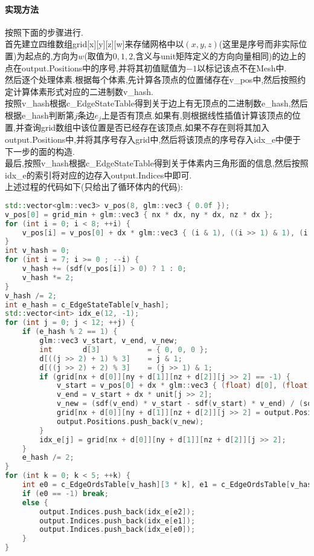 \documentclass{ctexart}
\begin{document}
\paragraph{实现方法}
按照下面的步骤进行.\\
\indent 首先建立四维数组{\codefont grid[x][y][z][w]}来存储网格中以$(x,y,z)$(这里是序号而非实际位置)为起点的,方向为$w$(取值为$0,1,2$,含义与{\codefont unit}矩阵定义的方向向量相同)的边上的点在{\codefont output.Positions}中的序号,并将其初值赋值为$-1$以标记该点不在Mesh中.\\
\indent 然后逐个处理体素.根据每个体素,先计算各顶点的位置储存在{\codefont v\_pos}中,然后按照约定计算体素形式对应的二进制数{\codefont v\_hash}.\\
\indent 按照{\codefont v\_hash}根据{\codefont c\_EdgeStateTable}得到关于边上有无顶点的二进制数{\codefont e\_hash},然后根据{\codefont e\_hash}判断第$j$条边$e_j$上是否有顶点.如果有,则根据线性插值计算该顶点的位置,并查询{\codefont grid}数组中该位置是否已经存在该顶点,如果不存在则将其加入{\codefont output.Positions}中,并将其序号存入{\codefont grid}中,然后将该顶点的序号存入{\codefont idx\_e}中便于下一步的面的构造.\\
\indent 最后,按照{\codefont v\_hash}根据{\codefont c\_EdgeStateTable}得到关于体素内三角形面的信息,然后按照{\codefont idx\_e}的索引将对应的边存入{\codefont output.Indices}中即可.\\
\indent 上述过程的代码如下(只给出了循环体内的代码):
\begin{lstlisting}[language=C++]
std::vector<glm::vec3> v_pos(8, glm::vec3 { 0.0f });
v_pos[0] = grid_min + glm::vec3 { nx * dx, ny * dx, nz * dx };
for (int i = 0; i < 8; ++i) {
    v_pos[i] = v_pos[0] + dx * glm::vec3 { (i & 1), ((i >> 1) & 1), (i >> 2) };
}
int v_hash = 0;
for (int i = 7; i >= 0 ; --i) {
    v_hash += (sdf(v_pos[i]) > 0) ? 1 : 0;
    v_hash *= 2;
}
v_hash /= 2;
int e_hash = c_EdgeStateTable[v_hash];
std::vector<int> idx_e(12, -1);
for (int j = 0; j < 12; ++j) {
    if (e_hash % 2 == 1) {
        glm::vec3 v_start, v_end, v_new;
        int       d[3]           = { 0, 0, 0 };
        d[((j >> 2) + 1) % 3]    = j & 1;
        d[((j >> 2) + 2) % 3]    = (j >> 1) & 1;
        if (grid[nx + d[0]][ny + d[1]][nz + d[2]][j >> 2] == -1) {
            v_start = v_pos[0] + dx * glm::vec3 { (float) d[0], (float) d[1], (float) d[2] };
            v_end = v_start + dx * unit[j >> 2];
            v_new = (sdf(v_end) * v_start - sdf(v_start) * v_end) / (sdf(v_end) - sdf(v_start));
            grid[nx + d[0]][ny + d[1]][nz + d[2]][j >> 2] = output.Positions.size();
            output.Positions.push_back(v_new);
        }
        idx_e[j] = grid[nx + d[0]][ny + d[1]][nz + d[2]][j >> 2];
    }
    e_hash /= 2;
}
for (int k = 0; k < 5; ++k) {
    int e0 = c_EdgeOrdsTable[v_hash][3 * k], e1 = c_EdgeOrdsTable[v_hash][3 * k + 1], e2 = c_EdgeOrdsTable[v_hash][3 * k + 2];
    if (e0 == -1) break;
    else {
        output.Indices.push_back(idx_e[e2]);
        output.Indices.push_back(idx_e[e1]);
        output.Indices.push_back(idx_e[e0]);
    }
}
\end{lstlisting}
\end{document}
